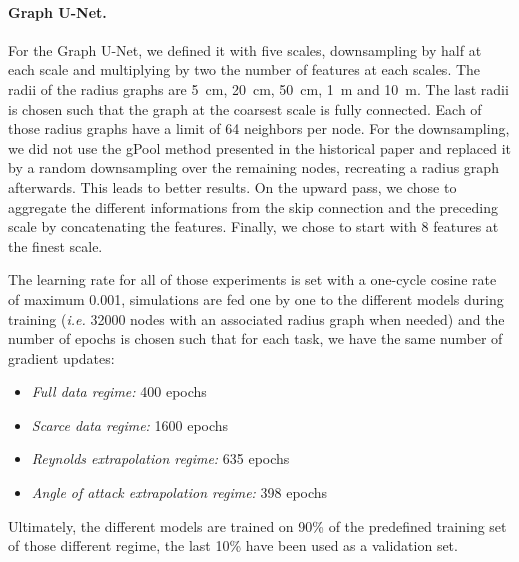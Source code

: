 \begin{subappendices}
	\paragraph{Graph U-Net.} For the Graph U-Net, we defined it with five scales, downsampling by half at each scale and multiplying by two the number of features at each scales. The radii of the radius graphs are \SI{5}{\centi\meter}, \SI{20}{\centi\meter}, \SI{50}{\centi\meter}, \SI{1}{\meter} and \SI{10}{\meter}. The last radii is chosen such that the graph at the coarsest scale is fully connected. Each of those radius graphs have a limit of 64 neighbors per node. For the downsampling, we did not use the gPool method presented in the historical paper \cite{gunet} and replaced it by a random downsampling over the remaining nodes, recreating a radius graph afterwards. This leads to better results. On the upward pass, we chose to aggregate the different informations from the skip connection and the preceding scale by concatenating the features. Finally, we chose to start with 8 features at the finest scale.
	
	The learning rate for all of those experiments is set with a one-cycle cosine \cite{onecyclelr}  rate of maximum 0.001, simulations are fed one by one to the different models during training (\emph{i.e.} 32000 nodes with an associated radius graph when needed) and the number of epochs is chosen such that for each task, we have the same number of gradient updates:
	\begin{itemize}
		\item \emph{Full data regime:} 400 epochs
		\item \emph{Scarce data regime:} 1600 epochs
		\item \emph{Reynolds extrapolation regime:} 635 epochs
		\item \emph{Angle of attack extrapolation regime:} 398 epochs
	\end{itemize}
	
	Ultimately, the different models are trained on 90\% of the predefined training set of those different regime, the last 10\% have been used as a validation set.
\end{subappendices}